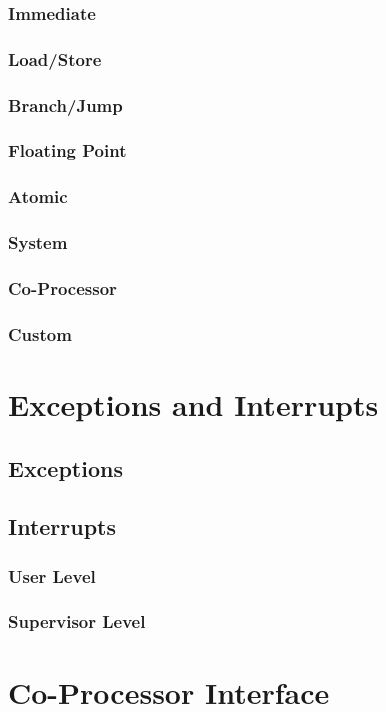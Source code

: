 \documentclass[letterpaper, 11pt]{article}
\begin{document}
\subsubsection{Immediate}
\subsubsection{Load/Store}
\subsubsection{Branch/Jump}
\subsubsection{Floating Point}
\subsubsection{Atomic}
\subsubsection{System}
\subsubsection{Co-Processor}
\subsubsection{Custom}


\section{Exceptions and Interrupts}
\subsection{Exceptions}


\subsection{Interrupts}
\subsubsection{User Level}
\subsubsection{Supervisor Level}

\section{Co-Processor Interface}
\end{document}
